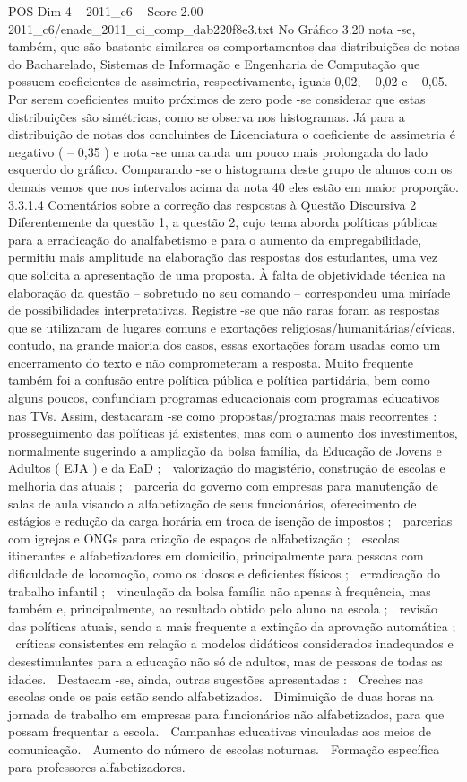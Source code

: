 \begin{textsample}{POS Dim 4 – 2011\_c6 – Score 2.00 – 2011\_c6/enade\_2011\_ci\_comp\_dab220f8e3.txt}
No Gráfico 3.20 nota -se, também, que são bastante similares os comportamentos das distribuições de notas do Bacharelado, Sistemas de Informação e Engenharia de Computação que possuem coeficientes de assimetria, respectivamente, iguais 0,02, – 0,02 e – 0,05.
Por serem coeficientes muito próximos de zero pode -se considerar que estas distribuições são simétricas, como se observa nos histogramas.
Já para a distribuição de notas dos concluintes de Licenciatura o coeficiente de assimetria é negativo ( – 0,35 ) e nota -se uma cauda um pouco mais prolongada do lado esquerdo do gráfico.
Comparando -se o histograma deste grupo de alunos com os demais vemos que nos intervalos acima da nota 40 eles estão em maior proporção. 3.3.1.4 Comentários sobre a correção das respostas à Questão Discursiva 2 Diferentemente da questão 1, a questão 2, cujo tema aborda políticas públicas para a erradicação do analfabetismo e para o aumento da empregabilidade, permitiu mais amplitude na elaboração das respostas dos estudantes, uma vez que solicita a apresentação de uma proposta.
À falta de objetividade técnica na elaboração da questão – sobretudo no seu comando – correspondeu uma miríade de possibilidades interpretativas.
Registre -se que não raras foram as respostas que se utilizaram de lugares comuns e exortações religiosas/humanitárias/cívicas, contudo, na grande maioria dos casos, essas exortações foram usadas como um encerramento do texto e não comprometeram a resposta.
Muito frequente também foi a confusão entre política pública e política partidária, bem como alguns poucos, confundiam programas educacionais com programas educativos nas TVs.
Assim, destacaram -se como propostas/programas mais recorrentes :  prosseguimento das políticas já existentes, mas com o aumento dos investimentos, normalmente sugerindo a ampliação da bolsa família, da Educação de Jovens e Adultos ( EJA ) e da EaD ;  valorização do magistério, construção de escolas e melhoria das atuais ;  parceria do governo com empresas para manutenção de salas de aula visando a alfabetização de seus funcionários, oferecimento de estágios e redução da carga horária em troca de isenção de impostos ;  parcerias com igrejas e ONGs para criação de espaços de alfabetização ;  escolas itinerantes e alfabetizadores em domicílio, principalmente para pessoas com dificuldade de locomoção, como os idosos e deficientes físicos ;  erradicação do trabalho infantil ;  vinculação da bolsa família não apenas à frequência, mas também e, principalmente, ao resultado obtido pelo aluno na escola ;  revisão das políticas atuais, sendo a mais frequente a extinção da aprovação automática ;  críticas consistentes em relação a modelos didáticos considerados inadequados e desestimulantes para a educação não só de adultos, mas de pessoas de todas as idades.  Destacam -se, ainda, outras sugestões apresentadas :  Creches nas escolas onde os pais estão sendo alfabetizados.  Diminuição de duas horas na jornada de trabalho em empresas para funcionários não alfabetizados, para que possam frequentar a escola.  Campanhas educativas vinculadas aos meios de comunicação.  Aumento do número de escolas noturnas.  Formação específica para professores alfabetizadores.

\end{textsample}
